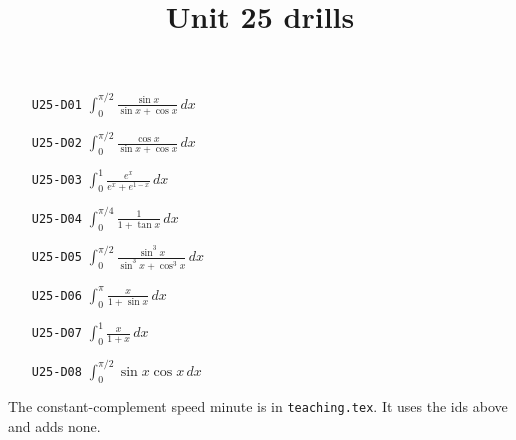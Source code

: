 \title{Unit 25 drills}\maketitle\begin{enumerate}
  \item[\texttt{U25-D01}] $\displaystyle \int_{0}^{\pi/2}\frac{\sin x}{\sin x+\cos x}\,dx$
  \item[\texttt{U25-D02}] $\displaystyle \int_{0}^{\pi/2}\frac{\cos x}{\sin x+\cos x}\,dx$
  \item[\texttt{U25-D03}] $\displaystyle \int_{0}^{1}\frac{e^{x}}{e^{x}+e^{1-x}}\,dx$
  \item[\texttt{U25-D04}] $\displaystyle \int_{0}^{\pi/4}\frac{1}{1+\tan x}\,dx$
  \item[\texttt{U25-D05}] $\displaystyle \int_{0}^{\pi/2}\frac{\sin^{3}x}{\sin^{3}x+\cos^{3}x}\,dx$
  \item[\texttt{U25-D06}] $\displaystyle \int_{0}^{\pi}\frac{x}{1+\sin x}\,dx$
  \item[\texttt{U25-D07}] $\displaystyle \int_{0}^{1}\frac{x}{1+x}\,dx$
  \item[\texttt{U25-D08}] $\displaystyle \int_{0}^{\pi/2}\sin x\cos x\,dx$
\end{enumerate}
\noindent The constant-complement speed minute is in \texttt{teaching.tex}. It uses the ids above and adds none.

